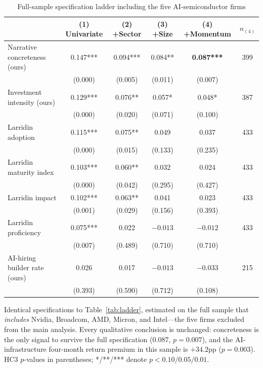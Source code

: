 \documentclass[11pt]{article}
\newcommand{\coef}[1]{\ensuremath{#1}}
\begin{document}
\begin{table}[H]
\centering
\begin{threeparttable}
\caption{Full-sample specification ladder including the five AI-semiconductor firms}
\label{tab:fullsample}
\small
\begin{tabular}{lccccc}
\toprule
 & (1) Univariate & (2) +Sector & (3) +Size & (4) +Momentum & $n_{(4)}$\\
\midrule
Narrative concreteness (ours) & 0.147*** & 0.094*** & 0.084** & \textbf{0.087***} & 399\\
 & (0.000) & (0.005) & (0.011) & (0.007) & \\
Investment intensity (ours) & 0.129*** & 0.076** & 0.057* & 0.048* & 387\\
 & (0.000) & (0.020) & (0.071) & (0.100) & \\
Larridin adoption & 0.115*** & 0.075** & 0.049 & 0.037 & 433\\
 & (0.000) & (0.015) & (0.133) & (0.235) & \\
Larridin maturity index & 0.103*** & 0.060** & 0.032 & 0.024 & 433\\
 & (0.000) & (0.042) & (0.295) & (0.427) & \\
Larridin impact & 0.102*** & 0.063** & 0.041 & 0.023 & 433\\
 & (0.001) & (0.029) & (0.156) & (0.393) & \\
Larridin proficiency & 0.075*** & 0.022 & $-0.013$ & $-0.012$ & 433\\
 & (0.007) & (0.489) & (0.710) & (0.710) & \\
AI-hiring builder rate (ours) & 0.026 & 0.017 & $-0.013$ & $-0.033$ & 215\\
 & (0.393) & (0.590) & (0.712) & (0.108) & \\
\bottomrule
\end{tabular}
\begin{tablenotes}\footnotesize
\item Identical specifications to Table~\ref{tab:ladder}, estimated on the full
sample that \emph{includes} Nvidia, Broadcom, AMD, Micron, and Intel---the five
firms excluded from the main analysis. Every qualitative conclusion is
unchanged: concreteness is the only signal to survive the full specification
(\coef{0.087}, $p=0.007$), and the AI-infrastructure four-month return premium
in this sample is $+34.2$pp ($p=0.003$). HC3 $p$-values in parentheses;
*/**/*** denote $p<0.10/0.05/0.01$.
\end{tablenotes}
\end{threeparttable}
\end{table}
\end{document}

